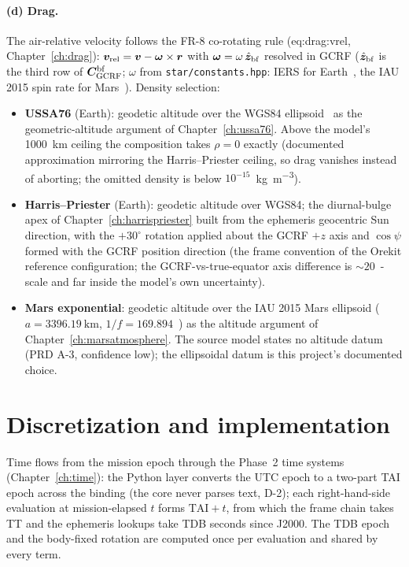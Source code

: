 \paragraph{(d) Drag.} The air-relative velocity follows the FR-8
co-rotating rule (eq:drag:vrel, Chapter~\ref{ch:drag}):
$\bm{v}_{\mathrm{rel}} = \bm{v} - \bm{\omega} \times \bm{r}$ with
$\bm{\omega} = \omega\,\hat{\bm{z}}_{\mathrm{bf}}$ resolved in GCRF
($\hat{\bm{z}}_{\mathrm{bf}}$ is the third row of
$\bm{C}_{\mathrm{GCRF}}^{\mathrm{bf}}$; $\omega$ from
\texttt{star/constants.hpp}: IERS for Earth~\cite{iers2010}, the IAU 2015
spin rate for Mars~\cite{archinal2018}). Density selection:
\begin{itemize}
  \item \textbf{USSA76} (Earth): geodetic altitude over the WGS84
    ellipsoid~\cite{nima2000} as the geometric-altitude argument of
    Chapter~\ref{ch:ussa76}. Above the model's \qty{1000}{\kilo\metre}
    ceiling the composition takes $\rho = 0$ exactly (documented
    approximation mirroring the Harris--Priester ceiling, so drag
    vanishes instead of aborting; the omitted density is below
    $10^{-15}$~\unit{\kilogram\per\metre\cubed}).
  \item \textbf{Harris--Priester} (Earth): geodetic altitude over WGS84;
    the diurnal-bulge apex of Chapter~\ref{ch:harrispriester} built from
    the ephemeris geocentric Sun direction, with the $+30^{\circ}$
    rotation applied about the GCRF $+z$ axis and $\cos\psi$ formed with
    the GCRF position direction (the frame convention of the Orekit
    reference configuration; the GCRF-vs-true-equator axis difference is
    $\sim 20$~\unit{\mas}-scale and far inside the model's own
    uncertainty).
  \item \textbf{Mars exponential}: geodetic altitude over the IAU 2015
    Mars ellipsoid ($a = \qty{3396.19}{\kilo\metre}$,
    $1/f = 169.894$~\cite{archinal2018}) as the altitude argument of
    Chapter~\ref{ch:marsatmosphere}. The source model states no altitude
    datum (PRD A-3, confidence low); the ellipsoidal datum is this
    project's documented choice.
\end{itemize}

\section{Discretization and implementation}
\label{sec:env:implementation}

Time flows from the mission epoch through the Phase~2 time systems
(Chapter~\ref{ch:time}): the Python layer converts the UTC epoch to a
two-part TAI epoch across the binding (the core never parses text, D-2);
each right-hand-side evaluation at mission-elapsed $t$ forms
$\mathrm{TAI} + t$, from which the frame chain takes TT and the ephemeris
lookups take TDB seconds since J2000. The TDB epoch and the body-fixed
rotation are computed once per evaluation and shared by every term.

